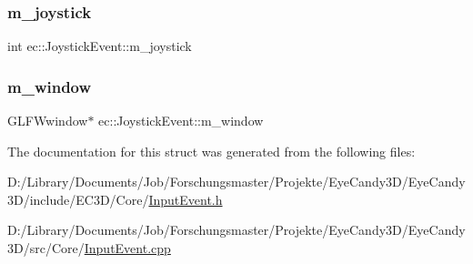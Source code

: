 \mbox{\label{structec_1_1_joystick_event_a415b6d2d801b41db8f3dee6b2be35448}} 
\subsubsection{\texorpdfstring{m\+\_\+joystick}{m\_joystick}}
{\footnotesize\ttfamily int ec\+::\+Joystick\+Event\+::m\+\_\+joystick}

\mbox{\label{structec_1_1_joystick_event_a9b108de0a7db9268dd11642a203ef816}} 
\subsubsection{\texorpdfstring{m\+\_\+window}{m\_window}}
{\footnotesize\ttfamily G\+L\+F\+Wwindow$\ast$ ec\+::\+Joystick\+Event\+::m\+\_\+window}



The documentation for this struct was generated from the following files\+:\begin{DoxyCompactItemize}
\item 
D\+:/\+Library/\+Documents/\+Job/\+Forschungsmaster/\+Projekte/\+Eye\+Candy3\+D/\+Eye\+Candy3\+D/include/\+E\+C3\+D/\+Core/\mbox{\hyperlink{_input_event_8h}{Input\+Event.\+h}}\item 
D\+:/\+Library/\+Documents/\+Job/\+Forschungsmaster/\+Projekte/\+Eye\+Candy3\+D/\+Eye\+Candy3\+D/src/\+Core/\mbox{\hyperlink{_input_event_8cpp}{Input\+Event.\+cpp}}\end{DoxyCompactItemize}
